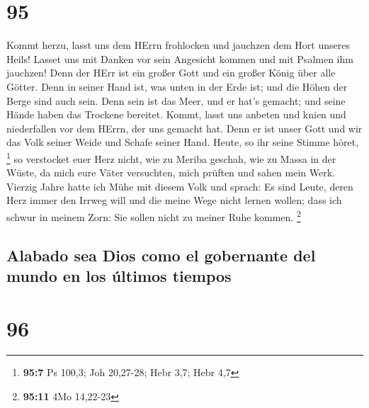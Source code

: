 \hypertarget{section-94}{%
\section{95}\label{section-94}}

 Kommt herzu, lasst uns dem HErrn frohlocken und jauchzen
dem Hort unseres Heils!  Lasset uns mit Danken vor sein
Angesicht kommen und mit Psalmen ihm jauchzen!  Denn der
HErr ist ein großer Gott und ein großer König über alle Götter.
 Denn in seiner Hand ist, was unten in der Erde ist; und
die Höhen der Berge sind auch sein.  Denn sein ist das
Meer, und er hat's gemacht; und seine Hände haben das Trockene bereitet.
 Kommt, lasst uns anbeten und knien und niederfallen vor
dem HErrn, der uns gemacht hat.  Denn er ist unser Gott
und wir das Volk seiner Weide und Schafe seiner Hand. Heute, so ihr
seine Stimme höret, \footnote{\textbf{95:7} Ps 100,3; Joh 20,27-28; Hebr
  3,7; Hebr 4,7}  so verstocket euer Herz nicht, wie zu
Meriba geschah, wie zu Massa in der Wüste,  da mich eure
Väter versuchten, mich prüften und sahen mein Werk. 
Vierzig Jahre hatte ich Mühe mit diesem Volk und sprach: Es sind Leute,
deren Herz immer den Irrweg will und die meine Wege nicht lernen wollen;
 dass ich schwur in meinem Zorn: Sie sollen nicht zu
meiner Ruhe kommen. \footnote{\textbf{95:11} 4Mo 14,22-23}

\hypertarget{alabado-sea-dios-como-el-gobernante-del-mundo-en-los-uxfaltimos-tiempos}{%
\subsection{Alabado sea Dios como el gobernante del mundo en los últimos
tiempos}\label{alabado-sea-dios-como-el-gobernante-del-mundo-en-los-uxfaltimos-tiempos}}

\hypertarget{section-95}{%
\section{96}\label{section-95}}

